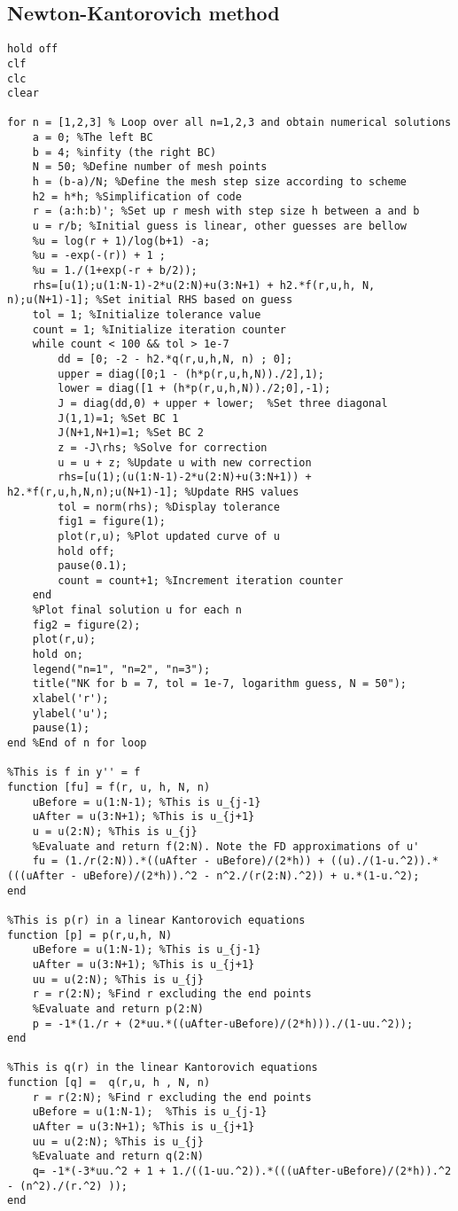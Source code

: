 \documentclass{article}
\begin{document}
\subsection{Newton-Kantorovich method}
\begin{lstlisting}
hold off
clf
clc
clear

for n = [1,2,3] % Loop over all n=1,2,3 and obtain numerical solutions
    a = 0; %The left BC
    b = 4; %infity (the right BC)
    N = 50; %Define number of mesh points
    h = (b-a)/N; %Define the mesh step size according to scheme
    h2 = h*h; %Simplification of code
    r = (a:h:b)'; %Set up r mesh with step size h between a and b
    u = r/b; %Initial guess is linear, other guesses are bellow
    %u = log(r + 1)/log(b+1) -a; 
    %u = -exp(-(r)) + 1 ;
    %u = 1./(1+exp(-r + b/2)); 
    rhs=[u(1);u(1:N-1)-2*u(2:N)+u(3:N+1) + h2.*f(r,u,h, N, n);u(N+1)-1]; %Set initial RHS based on guess
    tol = 1; %Initialize tolerance value
    count = 1; %Initialize iteration counter
    while count < 100 && tol > 1e-7
        dd = [0; -2 - h2.*q(r,u,h,N, n) ; 0];
        upper = diag([0;1 - (h*p(r,u,h,N))./2],1);
        lower = diag([1 + (h*p(r,u,h,N))./2;0],-1);
        J = diag(dd,0) + upper + lower;  %Set three diagonal
        J(1,1)=1; %Set BC 1
        J(N+1,N+1)=1; %Set BC 2
        z = -J\rhs; %Solve for correction
        u = u + z; %Update u with new correction
        rhs=[u(1);(u(1:N-1)-2*u(2:N)+u(3:N+1)) + h2.*f(r,u,h,N,n);u(N+1)-1]; %Update RHS values
        tol = norm(rhs); %Display tolerance
        fig1 = figure(1);
        plot(r,u); %Plot updated curve of u
        hold off;
        pause(0.1);
        count = count+1; %Increment iteration counter
    end
    %Plot final solution u for each n
    fig2 = figure(2);
    plot(r,u);
    hold on;
    legend("n=1", "n=2", "n=3");
    title("NK for b = 7, tol = 1e-7, logarithm guess, N = 50");
    xlabel('r');
    ylabel('u');
    pause(1);
end %End of n for loop

%This is f in y'' = f
function [fu] = f(r, u, h, N, n)
    uBefore = u(1:N-1); %This is u_{j-1}
    uAfter = u(3:N+1); %This is u_{j+1}
    u = u(2:N); %This is u_{j}
    %Evaluate and return f(2:N). Note the FD approximations of u' 
    fu = (1./r(2:N)).*((uAfter - uBefore)/(2*h)) + ((u)./(1-u.^2)).*(((uAfter - uBefore)/(2*h)).^2 - n^2./(r(2:N).^2)) + u.*(1-u.^2);
end 

%This is p(r) in a linear Kantorovich equations
function [p] = p(r,u,h, N)
    uBefore = u(1:N-1); %This is u_{j-1}
    uAfter = u(3:N+1); %This is u_{j+1}
    uu = u(2:N); %This is u_{j}
    r = r(2:N); %Find r excluding the end points
    %Evaluate and return p(2:N)
    p = -1*(1./r + (2*uu.*((uAfter-uBefore)/(2*h)))./(1-uu.^2));
end

%This is q(r) in the linear Kantorovich equations
function [q] =  q(r,u, h , N, n)
    r = r(2:N); %Find r excluding the end points
    uBefore = u(1:N-1);  %This is u_{j-1}
    uAfter = u(3:N+1); %This is u_{j+1}
    uu = u(2:N); %This is u_{j}
    %Evaluate and return q(2:N)
    q= -1*(-3*uu.^2 + 1 + 1./((1-uu.^2)).*(((uAfter-uBefore)/(2*h)).^2 - (n^2)./(r.^2) )); 
end
\end{lstlisting}
\pagebreak
\end{document}
